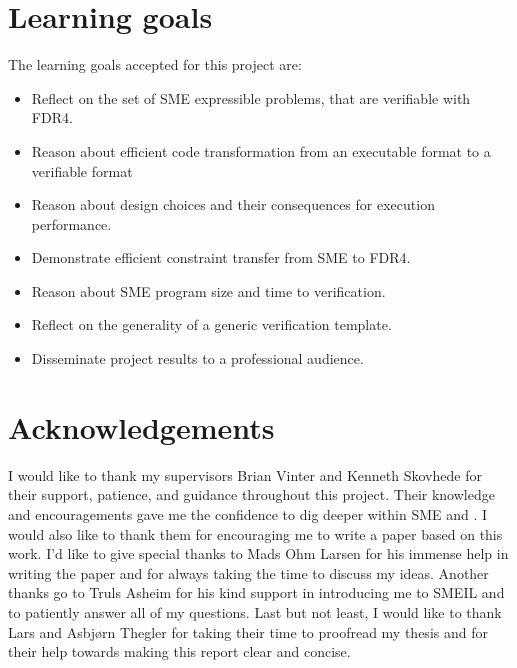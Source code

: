 \section{Learning goals}
The learning goals accepted for this project are:
\begin{itemize}
\item Reflect on the set of SME expressible problems, that are verifiable with FDR4.
\item Reason about efficient code transformation from an executable format to a verifiable format
\item Reason about design choices and their consequences for execution performance.
\item Demonstrate efficient constraint transfer from SME to FDR4.
\item Reason about SME program size and time to verification.
\item Reflect on the generality of a generic verification template.
\item Disseminate project results to a professional audience.
\end{itemize}

\section{Acknowledgements}
I would like to thank my supervisors Brian Vinter and Kenneth Skovhede for their support, patience, and guidance throughout this project. Their knowledge and encouragements gave me the confidence to dig deeper within SME and \cspm{}. I would also like to thank them for encouraging me to write a paper based on this work.
I'd like to give special thanks to Mads Ohm Larsen for his immense help in writing the paper and for always taking the time to discuss my ideas.
Another thanks go to Truls Asheim for his kind support in introducing me to SMEIL and to patiently answer all of my questions.
Last but not least, I would like to thank Lars and Asbj\o rn Thegler for taking their time to proofread my thesis and for their help towards making this report clear and concise.
